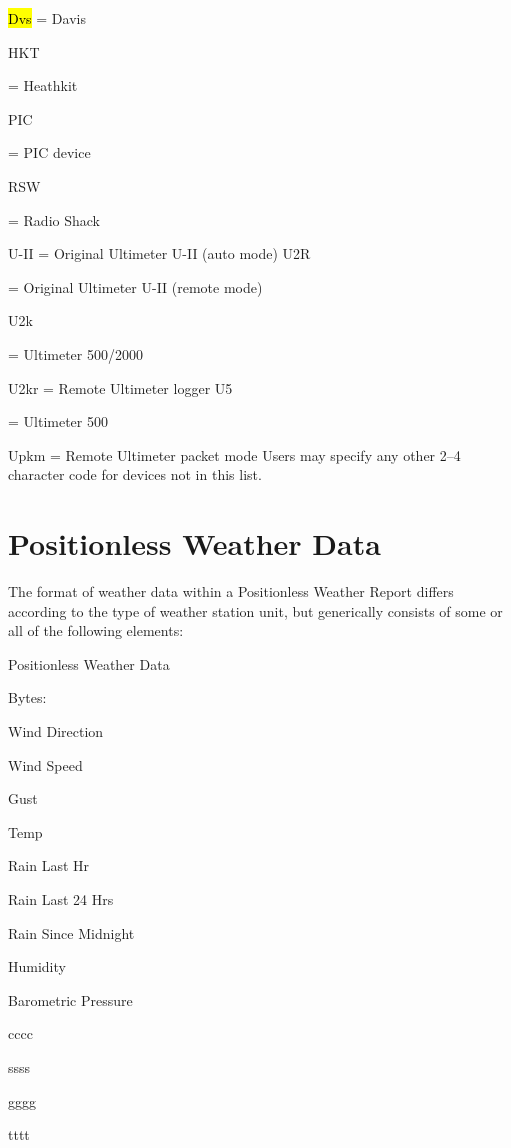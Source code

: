 \begin{description}

  \item \hl{Dvs} = Davis

HKT

= Heathkit

PIC

= PIC device

RSW

= Radio Shack

U-II = Original Ultimeter U-II (auto mode)
U2R

= Original Ultimeter U-II (remote mode)

U2k

= Ultimeter 500/2000

U2kr = Remote Ultimeter logger
U5

= Ultimeter 500

Upkm = Remote Ultimeter packet mode
Users may specify any other 2–4 character code for devices not in this list.



\end{description}

\section {Positionless Weather Data}

The format of weather data within a Positionless Weather Report differs
according to the type of weather station unit, but generically consists of some
or all of the following elements:


Positionless Weather Data

Bytes:

Wind
Direction

Wind
Speed

Gust

Temp

Rain
Last Hr

Rain
Last 24 Hrs

Rain
Since Midnight

Humidity

Barometric
Pressure

cccc

ssss

gggg

tttt


